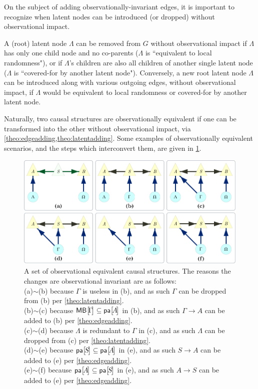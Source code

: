 On the subject of adding observationally-invariant edges, it is important to recognize when latent nodes can be introduced (or dropped) without observational impact.
\begin{theorem}\label{theo:latentadding}
A (root) latent node $\Lambda$ can be removed from $G$ without observational impact if $\Lambda$ has only one child node and no co-parents ($\Lambda$ is ``equivalent to local randomness"), or if $\Lambda$'s children are also all children of another single latent node ($\Lambda$ is ``covered-for by another latent node"). Conversely, a new root latent node $\Lambda$ can be introduced along with various outgoing edges, without observational impact, if $\Lambda$ would be equivalent to local randomness or covered-for by another latent node.
\end{theorem}

\clearpage
Naturally, two causal structures are observationally equivalent if one can be transformed into the other without observational impact, via \cref{theo:edgeadding,theo:latentadding}. Some examples of observationally equivalent scenarios, and the steps which interconvert them, are given in \cref{fig:equivalences}.
\begin{figure}[hb]
\centering
\includegraphics[width=\linewidth]{ObservationalEquivalencesExamples.pdf}
\caption{A set of observational equivalent causal structures. The reasons the changes are observational invariant are as follows: \\
(a)$\sim$(b) because $\Gamma$ is useless in (b), and as such $\Gamma$ can be dropped from (b) per \cref{theo:latentadding}.\\
(b)$\sim$(c) because $\NamedFunction{MB}{\!\Gamma\!}\subseteq\NamedFunction{pa}{\!A\!}$ in (b), and as such $\Gamma\to A$ can be added to (b) per \cref{theo:edgeadding}.\\
(c)$\sim$(d) because $\Lambda$ is redundant to $\Gamma$ in (c), and as such $\Lambda$ can be dropped from (c) per \cref{theo:latentadding}.\\
(d)$\sim$(e) because $\NamedFunction{pa}{\!S\!}\subseteq\NamedFunction{pa}{\!A\!}$ in (e), and as such $S\to A$ can be added to (e) per \cref{theo:edgeadding}.\\
(e)$\sim$(f) because $\NamedFunction{pa}{\!A\!}\subseteq\NamedFunction{pa}{\!S\!}$ in (e), and as such $A\to S$ can be added to (e) per \cref{theo:edgeadding}.
}\label{fig:equivalences}
\end{figure}


